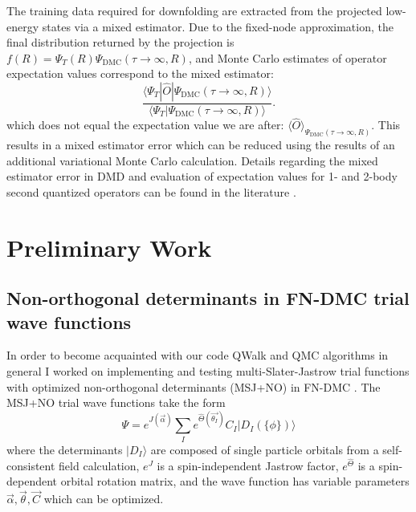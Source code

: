 \documentclass[12pt]{article}
\begin{document}
The training data required for downfolding are extracted from the projected low-energy states via a mixed estimator.
Due to the fixed-node approximation, the final distribution returned by the projection is $f(R) = \Psi_T(R) \Psi_\text{DMC}(\tau \rightarrow \infty, R)$, and Monte Carlo estimates of operator expectation values correspond to the mixed estimator: 
\begin{equation}
\frac{\langle \Psi_T | \hat{O} | \Psi_\text{DMC} (\tau \rightarrow \infty, R) \rangle}{\langle \Psi_T | \Psi_\text{DMC} (\tau \rightarrow \infty, R) \rangle}.
\end{equation}
which does not equal the expectation value we are after: $\langle \hat{O} \rangle_{\Psi_\text{DMC}(\tau \rightarrow \infty, R)}$.
This results in a mixed estimator error which can be reduced using the results of an additional variational Monte Carlo calculation.
Details regarding the mixed estimator error in DMD and evaluation of expectation values for 1- and 2-body second quantized operators can be found in the literature \cite{Wagner2015, Wagner2017}.
\section{Preliminary Work}
\subsection{Non-orthogonal determinants in FN-DMC trial wave functions}
In order to become acquainted with our code QWalk \cite{Wagner2009} and QMC algorithms in general I worked on implementing and testing multi-Slater-Jastrow trial functions with optimized non-orthogonal determinants (MSJ+NO) in FN-DMC \cite{doi:10.1063/1.5052906}.
The MSJ+NO trial wave functions take the form
\begin{equation}
\Psi=e^{J(\vec{\alpha})} \sum_I e^{\hat{\Theta}(\vec{\theta_I})} C_I |D_I (\{ \phi\})\rangle
\end{equation}
where the determinants $|D_I\rangle$ are composed of single particle orbitals from a self-consistent field calculation, $e^J$ is a spin-independent Jastrow factor, $e^{\hat{\Theta}}$ is a spin-dependent orbital rotation matrix, and the wave function has variable parameters $\vec{\alpha}, \vec{\theta}, \vec{C}$ which can be optimized.
\end{document}
